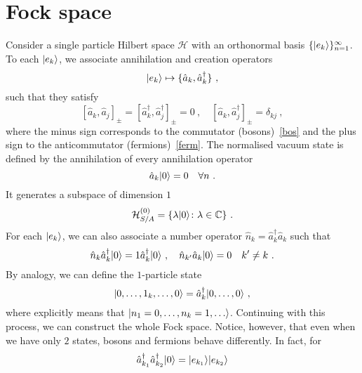 \section{Fock space}

    Consider a single particle Hilbert space $\mathcal H$ with an orthonormal basis $\{\vert e_k\rangle\}_{n=1}^\infty$. To each $\vert e_k\rangle$, we associate annihilation and creation operators
    \begin{equation*}
        \vert e_k\rangle \mapsto \{\hat a_k, \hat a_k^\dagger\} ~,
    \end{equation*}
    such that they satisfy
    \begin{equation}\label{comm}
        [\hat a_k, \hat a_j]_\pm = [\hat a_k^\dagger, \hat a_j^\dagger]_\pm = 0 ~, \quad [\hat a_k, \hat a_j^\dagger]_\pm = \delta_{kj} ~,
    \end{equation}
    where the minus sign corresponds to the commutator (bosons)~\eqref{bos} and the plus sign to the anticommutator (fermions)~\eqref{ferm}. The normalised vacuum state is defined by the annihilation of every annihilation operator
    \begin{equation*}
        \hat a_k \vert0\rangle = 0 \quad \forall n~.
    \end{equation*}
    It generates a subspace of dimension $1$ 
    \begin{equation}\label{vac}
        \mathcal H^{(0)}_{S/A} = \{\lambda \vert0\rangle \colon \lambda \in \mathbb C \} ~.
    \end{equation}
    For each $\vert e_k\rangle$, we can also associate a number operator $\hat n_k = \hat a_k^\dagger \hat a_k$ such that 
    \begin{equation*}
        \hat n_k \hat a_k^\dagger \vert0\rangle = 1 \hat a_k^\dagger \vert0\rangle ~, \quad \hat n_{k'} \hat a_k \vert0\rangle = 0 \quad k' \neq k ~.
    \end{equation*}
    By analogy, we can define the $1$-particle state
    \begin{equation*}
        \vert0, \ldots, 1_k, \ldots, 0\rangle = \hat a_k^\dagger \vert0, \ldots, 0\rangle ~,
    \end{equation*}
    where explicitly means that $\vert n_1=0, \ldots, n_k=1, \ldots\rangle$. Continuing with this process, we can construct the whole Fock space. Notice, however, that even when we have only $2$ states, bosons and fermions behave differently. In fact, for
    \begin{equation*}
        \hat a_{k_1}^\dagger \hat a_{k_2}^\dagger \vert0\rangle = \vert e_{k_1}\rangle \vert e_{k_2}\rangle 
    \end{equation*}
